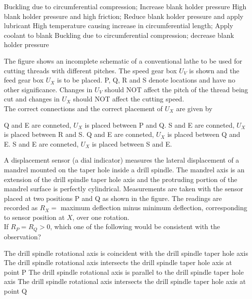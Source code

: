 \documentclass[addpoints,11pt]{exam}
\begin{document}
\begin{questions}
    \begin{choices}
        \choice Buckling due to circumferential compression; Increase blank holder pressure
        \choice High blank holder pressure and high friction; Reduce blank holder pressure and apply lubricant
        \choice High temperature causing increase in circumferential length; Apply coolant to blank
        \choice Buckling due to circumferential compression; decrease blank holder pressure
    \end{choices}

    \question The figure shows an incomplete schematic of a conventional lathe to be used for cutting threads with different pitches. The speed gear box $U_V$ is shown and the feed gear box $U_X$ is to be placed. P, Q, R and S denote locations and have no other significance. Changes in $U_V$ should NOT affect the pitch of the thread being cut and changes in $U_X$ should NOT affect the cutting speed.%
    \\The correct connections and the correct placement of $U_X$ are given by

    \begin{choices}
        \choice Q and E are conneted, $U_X$ is placed between P and Q.
        \choice S and E are conneted, $U_X$ is placed between R and S.
        \choice Q and E are conneted, $U_X$ is placed between Q and E.
        \choice S and E are conneted, $U_X$ is placed between S and E.
    \end{choices}

    \question A displacement sensor (a dial indicator) measures the lateral displacement of a mandrel mounted on the taper hole inside a drill spindle. The mandrel axis is an extension of the drill spindle taper hole axis and the protruding portion of the mandrel surface is perfectly cylindrical. Measurements are taken with the sensor placed at two positions P and Q as shown in the figure. The readings are recorded as $R_X = $ maximum deflection minus minimum deflection, corresponding to sensor position at $X$, over one rotation.%
    \\If $R_P=R_Q>0$, which one of the following would be consistent with the observation?

    \begin{choices}
        \choice The drill spindle rotational axis is coincident with the drill spindle taper hole axis
        \choice The drill spindle rotational axis intersects the drill spindle taper hole axis at point P
        \choice The drill spindle rotational axis is parallel to the drill spindle taper hole axis
        \choice The drill spindle rotational axis intersects the drill spindle taper hole axis at point Q
    \end{choices}


\end{questions}
\end{document}
